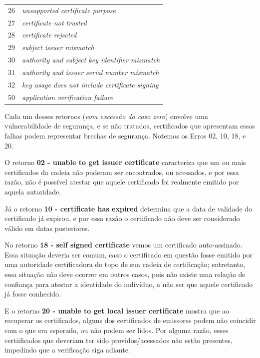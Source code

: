 \begin{center}
\begin{longtable}{c>{\em}l}
		\rowcolor[gray]{0.9}
		26 & unsupported certificate purpose \\ 
		27 & certificate not trusted \\ 
		\rowcolor[gray]{0.9}
		28 & certificate rejected \\ 
		29 & subject issuer mismatch \\ 
		\rowcolor[gray]{0.9}
		30 & authority and subject key identifier mismatch \\ 
		31 & authority and issuer serial number mismatch \\ 
		\rowcolor[gray]{0.9}
		32 & key usage does not include certificate signing \\ 
		50 & application verification failure \\ 
		\bottomrule
		\end{longtable}
	\end{center}

	Cada um desses retornos (\textit{com excessão do caso zero}) envolve uma vulnerabilidade de segurança, e se não tratados, certificados que apresentam essas falhas podem representar brechas de segurança. Notemos os Erros 02, 10, 18, e 20.

	O retorno \textbf{02 - unable to get issuer certificate} caracteriza que um ou mais certificados da cadeia não puderam ser encontrados, ou acessados, e por essa razão, não é possível atestar que aquele certificado foi realmente emitido por aquela autoridade.

	Já o retorno \textbf{10 - certificate has expired} determina que a data de validade do certificado já expirou, e por essa razão o certificado não deve ser considerado válido em datas posteriores.

	No retorno \textbf{18 - self signed certificate} vemos um certificado auto-assinado. Essa situação deveria ser comum, caso o certificado em questão fosse emitido por uma autoridade certificadora do topo de sua cadeia de certificação; entretanto, essa situação não deve ocorrer em outros casos, pois não existe uma relação de confiança para atestar a identidade do indivíduo, a não ser que aquele certificado já fosse conhecido.

	E o retorno \textbf{20 - unable to get local issuer certificate} mostra que ao recuperar os certificados, alguns dos certificados de emissores podem não coincidir com o que era esperado, ou não podem ser lidos. Por alguma razão, esses certiificados que deveriam ter sido providos/acessados não estão presentes, impedindo que a verificação siga adiante.
